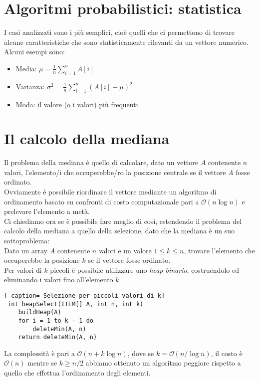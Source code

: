 \documentclass[../cheatSheetAlgoritmi.tex]{subfiles}
\begin{document}
\section{Algoritmi probabilistici: statistica}
I casi analizzati sono i più semplici, cioè quelli che ci permettono di trovare alcune caratteristiche che sono statisticamente rilevanti da un vettore numerico. \\
Alcuni esempi sono:
\begin{itemize}
	\item Media: $\mu = \frac{1}{n} \sum_{i = 1}^{n} A[i]$
	\item Varianza: $\sigma^2 = \frac{1}{n} \sum_{i = 1}^{n} (A[i] - \mu)^2$
	\item Moda: il valore (o i valori) più frequenti
\end{itemize} 
\section{Il calcolo della mediana}
Il problema della mediana è quello di calcolare, dato un vettore $A$ contenente $n$ valori, l'elemento/i che occuperebbe/ro la posizione centrale se il vettore $A$ fosse ordinato. \\
Ovviamente è possibile riordinare il vettore mediante un algoritmo di ordinamento basato su confronti di costo computazionale pari a $\mathcal{O}(n \log n)$ e prelevare l'elemento a metà. \\
Ci chiediamo ora se è possibile fare meglio di così, estendendo il problema del calcolo della mediana a quello della selezione, dato che la mediana è un suo sottoproblema: \\
Dato un array $A$ contenente $n$ valori e un valore $1 \leq k \leq n$, trovare l'elemento che occuperebbe la posizione $k$ se il vettore fosse ordinato. \\
Per valori di $k$ piccoli è possibile utilizzare uno \emph{heap binario}, costruendolo ed eliminando i valori fino all'elemento $k$.
 \begin{lstlisting}[ caption= Selezione per piccoli valori di k]
 int heapSelect(ITEM[] A, int n, int k)
	buildHeap(A)
	for i = 1 to k - 1 do
		deleteMin(A, n)
	return deleteMin(A, n) 	
\end{lstlisting}
La complessità è pari a $\mathcal{O}(n + k \log n)$, dove se $k = \mathcal{O}(n / \log n)$, il costo è $\mathcal{O}(n)$ mentre se $k \geq n/2$ abbiamo ottenuto un algoritmo peggiore rispetto a quello che effettua l'ordinamento degli elementi. \\
\end{document}
